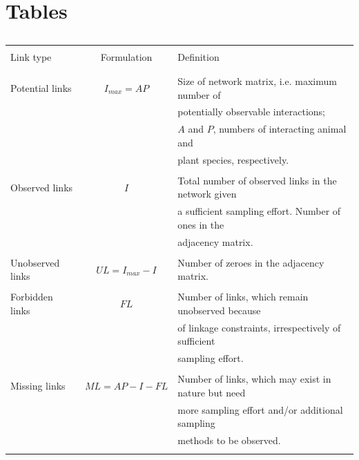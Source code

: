 \documentclass[12pt]{article}
\begin{document}
\section*{Tables}
\begin{table}[h!]
  \caption{}
  \begin{center}
		\begin{tabular}{lcl}
      \hline
\\Link type   &  Formulation   &   Definition\\\\
      \hline
\\Potential links&$I_{max}= AP$&Size of network matrix, i.e. maximum number of \\ && potentially observable interactions;  \\ && $A$ and $P$, numbers of interacting animal and \\ &&  plant species, respectively.\\\\
Observed links&$I$&Total number of observed links in the network given \\ &&  a sufficient sampling effort. Number of ones in the  \\ && adjacency matrix.\\\\
Unobserved links&$UL= I_{max} - I$&Number of zeroes in the adjacency matrix.\\\\
Forbidden links&$FL$&Number of links, which remain unobserved because  \\ && of linkage constraints, irrespectively of sufficient  \\ && sampling effort.\\\\
Missing links&$ML= AP - I - FL$&Number of links, which may exist in nature but need  \\ && more sampling effort and\slash or additional sampling  \\ && methods to be observed.\\\\
      \hline
		\end{tabular}
 	\end{center}
\end{table}
%
\newpage
\end{document}
